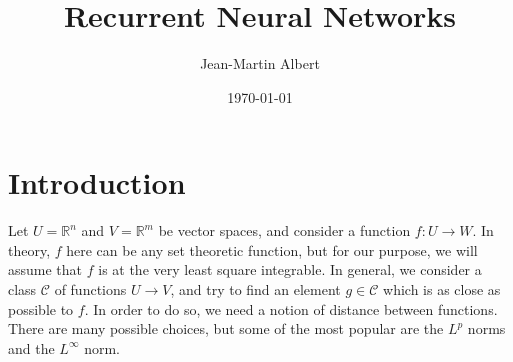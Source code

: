 \documentclass[10pt]{amsart}
\newcommand{\R}{\mathbb{R}}
\newcommand{\C}{\mathcal{C}}
\theoremstyle{definition}
\begin{document}
\title{Recurrent Neural Networks}
\author{Jean-Martin Albert}
\date{\today}
\maketitle







%
%
%
%


%
%








 \section{Introduction}

 Let $U=\R^n$ and $V=\R^m$ be vector spaces, and consider a function $f:U\to W$.
 In theory, $f$ here can be any set theoretic function, but for our purpose, we
 will assume that $f$ is at the very least square integrable. In general, we
 consider a class $\C$ of functions $U\to V$, and try to find an element $g\in\C$
 which is as close as possible to $f$.  In order to do so, we need a notion of distance
 between functions.  There are many possible choices, but some of the most popular are
 the $L^p$ norms and the $L^\infty$ norm.
\end{document}
